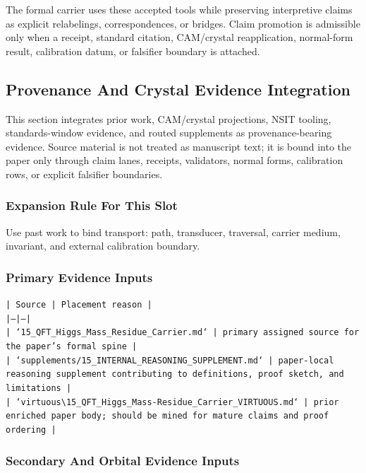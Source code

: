 \documentclass[11pt]{article}
\begin{document}
The formal carrier uses these accepted tools while preserving interpretive
claims as explicit relabelings, correspondences, or bridges. Claim promotion is admissible only when a receipt, standard citation,
CAM/crystal reapplication, normal-form result, calibration datum, or falsifier
boundary is attached.

\subsection*{Provenance And Crystal Evidence Integration}

This section integrates prior work, CAM/crystal projections, NSIT tooling,
standards-window evidence, and routed supplements as provenance-bearing
evidence. Source material is not treated as manuscript text; it is bound into
the paper only through claim lanes, receipts, validators, normal forms,
calibration rows, or explicit falsifier boundaries.

\subsubsection*{Expansion Rule For This Slot}

Use past work to bind transport: path, transducer, traversal, carrier medium, invariant, and external calibration boundary.

\subsubsection*{Primary Evidence Inputs}

\noindent\texttt{| Source | Placement reason |}\\
\noindent\texttt{|---|---|}\\
\noindent\texttt{| `15\_QFT\_Higgs\_Mass\_Residue\_Carrier.md` | primary assigned source for the paper's formal spine |}\\
\noindent\texttt{| `supplements/15\_INTERNAL\_REASONING\_SUPPLEMENT.md` | paper-local reasoning supplement contributing to definitions, proof sketch, and limitations |}\\
\noindent\texttt{| `virtuous\textbackslash{}15\_QFT\_Higgs\_Mass-Residue\_Carrier\_VIRTUOUS.md` | prior enriched paper body; should be mined for mature claims and proof ordering |}\\

\subsubsection*{Secondary And Orbital Evidence Inputs}
\end{document}
